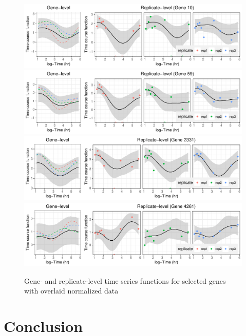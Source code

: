 \documentclass[11pt]{article}
\newcommand{\1}{\mathbf{1}}
\newcommand{\0}{\mathbf{0}}
\begin{document}
\begin{figure}[htp!]
	\centering
		\includegraphics[scale=0.8]{img/grid_gene10.pdf}
		\includegraphics[scale=0.8]{img/grid_gene59.pdf}
		\includegraphics[scale=0.8]{img/grid_gene2331.pdf}
		\includegraphics[scale=0.8]{img/grid_gene4261.pdf}
	\caption{Gene- and replicate-level time series functions for selected genes with overlaid normalized data}
	\label{fig:grids}
\end{figure}





\section{Conclusion}\label{Conclusion}
\end{document}
